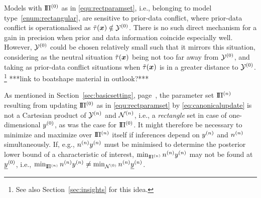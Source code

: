 
Models with $\text{I}\!\Pi^{(0)}$ as in \eqref{equ:rectparamset}, %
i.e., belonging to model type~\eqref{enum:rectangular},
are sensitive to prior-data conflict,
where prior-data conflict is operationalised as $\tilde{\tau}({\bm x}) \notin \mathcal{Y}^{(0)}$.
There is no such direct mechanism for a gain in precision when prior and data information coincide especially well.
However, $\mathcal{Y}^{(0)}$ could be chosen relatively small such that it mirrors this situation,
considering as the neutral situation $\tilde{\tau}({\bm x})$ being not too far away from $\mathcal{Y}^{(0)}$,
and taking as prior-data conflict situations when $\tilde{\tau}({\bm x})$ is in a greater distance to $\mathcal{Y}^{(0)}$.%
\footnote{See also Section~\ref{sec:insights} for this idea.}
***link to boatshape material in outlook?***

As mentioned in Section~\ref{sec:basicsetting}, page~\pageref{enum:rectangular},
the parameter set $\text{I}\!\Pi^{(n)}$ resulting from updating $\text{I}\!\Pi^{(0)}$ as in \eqref{equ:rectparamset}
by \eqref{eq:canonicalupdate} is not a Cartesian product of $\mathcal{Y}^{(n)}$ and $\mathcal{N}^{(n)}$,
i.e., a \emph{rectangle} set in case of one-dimensional $y^{(0)}$, as was the case for $\text{I}\!\Pi^{(0)}$.
It might therefore be necessary to minimize and maximize over $\text{I}\!\Pi^{(n)}$ itself if inferences depend on $y^{(n)}$ and $n^{(n)}$ simultaneously.
If, e.g., $n^{(n)}y^{(n)}$ must be minimised to determine the posterior lower bound of a characteristic of interest,
$\min_{\text{I}\!\Pi^{(n)}} n^{(n)}y^{(n)}$ may not be found at $\underline{y}^{(0)}$, i.e., $\min_{\text{I}\!\Pi^{(n)}} n^{(n)}y^{(n)} \not = \min_{\mathcal{N}^{(0)}} n^{(n)}\underline{y}^{(n)}$.

